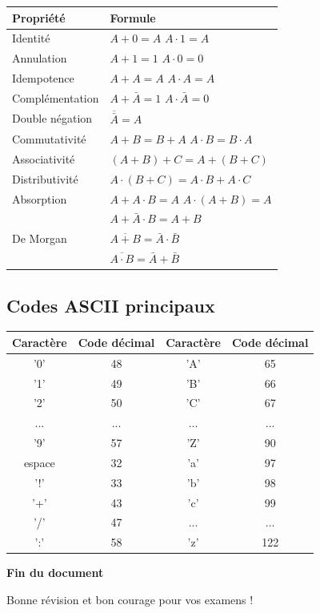 \documentclass[12pt,a4paper]{article}
\begin{document}
\begin{center}
\begin{tabular}{|l|l|}
\hline
\textbf{Propriété} & \textbf{Formule} \\
\hline
Identité & $A + 0 = A$ \quad $A \cdot 1 = A$ \\
Annulation & $A + 1 = 1$ \quad $A \cdot 0 = 0$ \\
Idempotence & $A + A = A$ \quad $A \cdot A = A$ \\
Complémentation & $A + \bar{A} = 1$ \quad $A \cdot \bar{A} = 0$ \\
Double négation & $\overline{\bar{A}} = A$ \\
Commutativité & $A + B = B + A$ \quad $A \cdot B = B \cdot A$ \\
Associativité & $(A + B) + C = A + (B + C)$ \\
Distributivité & $A \cdot (B + C) = A \cdot B + A \cdot C$ \\
Absorption & $A + A \cdot B = A$ \quad $A \cdot (A + B) = A$ \\
& $A + \bar{A} \cdot B = A + B$ \\
De Morgan & $\overline{A + B} = \bar{A} \cdot \bar{B}$ \\
& $\overline{A \cdot B} = \bar{A} + \bar{B}$ \\
\hline
\end{tabular}
\end{center}

\subsection*{Codes ASCII principaux}

\begin{center}
\begin{tabular}{|c|c||c|c|}
\hline
\textbf{Caractère} & \textbf{Code décimal} & \textbf{Caractère} & \textbf{Code décimal} \\
\hline
'0' & 48 & 'A' & 65 \\
'1' & 49 & 'B' & 66 \\
'2' & 50 & 'C' & 67 \\
... & ... & ... & ... \\
'9' & 57 & 'Z' & 90 \\
\hline
espace & 32 & 'a' & 97 \\
'!' & 33 & 'b' & 98 \\
'+' & 43 & 'c' & 99 \\
'/' & 47 & ... & ... \\
':' & 58 & 'z' & 122 \\
\hline
\end{tabular}
\end{center}

\vspace{1cm}

\begin{center}
\textcolor{titrebleu}{\Large\textbf{Fin du document}}

\vspace{0.5cm}

\textcolor{defvert}{\large Bonne révision et bon courage pour vos examens !}
\end{center}
\end{document}
